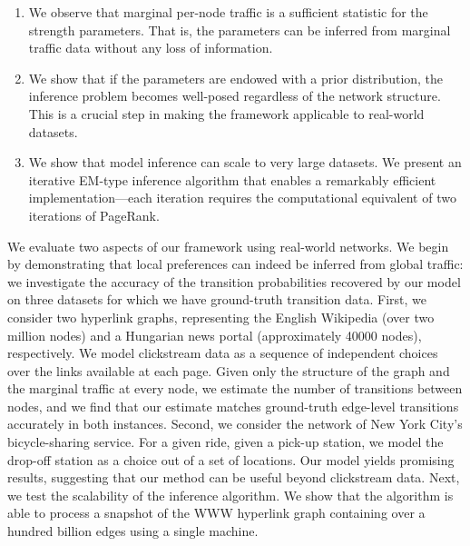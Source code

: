 \begin{enumerate}
\item We observe that marginal per-node traffic is a sufficient statistic for the strength parameters.
That is, the parameters can be inferred from marginal traffic data without any loss of information.

\item We show that if the parameters are endowed with a prior distribution, the inference problem becomes well-posed regardless of the network structure.
This is a crucial step in making the framework applicable to real-world datasets.

\item We show that model inference can scale to very large datasets.
We present an iterative EM-type inference algorithm that enables a remarkably efficient implementation---each iteration requires the computational equivalent of two iterations of PageRank.
\end{enumerate}


We evaluate two aspects of our framework using real-world networks.
We begin by demonstrating that local preferences can indeed be inferred from global traffic: we investigate the accuracy of the transition probabilities recovered by our model on three datasets for which we have ground-truth transition data.
First, we consider two hyperlink graphs, representing the English Wikipedia (over two million nodes) and a Hungarian news portal (approximately \num{40000} nodes), respectively.
We model clickstream data as a sequence of independent choices over the links available at each page.
Given only the structure of the graph and the marginal traffic at every node, we estimate the number of transitions between nodes, and we find that our estimate matches ground-truth edge-level transitions accurately in both instances.
Second, we consider the network of New York City's bicycle-sharing service.
For a given ride, given a pick-up station, we model the drop-off station as a choice out of a set of locations.
Our model yields promising results, suggesting that our method can be useful beyond clickstream data.
Next, we test the scalability of the inference algorithm.
We show that the algorithm is able to process a snapshot of the WWW hyperlink graph containing over a hundred billion edges using a single machine.


